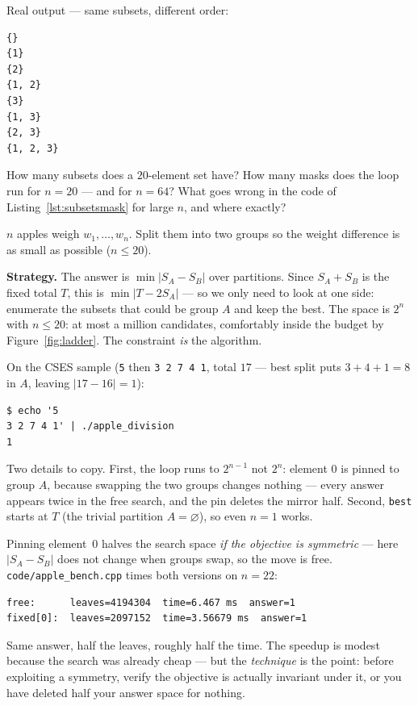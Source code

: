 Real output --- same subsets, different order:

\begin{lstlisting}[numbers=none]
{}
{1}
{2}
{1, 2}
{3}
{1, 3}
{2, 3}
{1, 2, 3}
\end{lstlisting}

\begin{exercise}[easy]\label{exr:subsetcount}
How many subsets does a $20$-element set have? How many masks does the loop
run for $n = 20$ --- and for $n = 64$? What goes wrong in the code of
Listing~\ref{lst:subsetsmask} for large $n$, and where exactly?
\end{exercise}

\begin{example}\label{ex:apple}
$n$ apples weigh $w_1, \dots, w_n$. Split them into two groups so the weight
difference is as small as possible ($n \le 20$).
\par\smallskip
\textbf{Strategy.} The answer is $\min |S_A - S_B|$ over partitions. Since
$S_A + S_B$ is the fixed total $T$, this is $\min |T - 2S_A|$ --- so we only
need to look at one side: enumerate the subsets that could be group $A$ and
keep the best. The space is $2^n$ with $n \le 20$: at most a million
candidates, comfortably inside the budget by Figure~\ref{fig:ladder}. The
constraint \emph{is} the algorithm.
\par\smallskip
\begin{solution}

On the CSES sample (\texttt{5} then \texttt{3 2 7 4 1}, total $17$ --- best
split puts $3+4+1=8$ in $A$, leaving $|17-16|=1$):
\begin{lstlisting}[numbers=none]
$ echo '5
3 2 7 4 1' | ./apple_division
1
\end{lstlisting}
Two details to copy. First, the loop runs to $2^{n-1}$ not $2^n$: element 0 is
pinned to group $A$, because swapping the two groups changes nothing --- every
answer appears twice in the free search, and the pin deletes the mirror half.
Second, \texttt{best} starts at $T$ (the trivial partition $A = \varnothing$),
so even $n = 1$ works.
\end{solution}
\end{example}

\begin{remark}
Pinning element~0 halves the search space \emph{if the objective is symmetric}
--- here $|S_A - S_B|$ does not change when groups swap, so the move is free.
\texttt{code/apple\_bench.cpp} times both versions on $n = 22$:
\begin{lstlisting}[numbers=none]
free:      leaves=4194304  time=6.467 ms  answer=1
fixed[0]:  leaves=2097152  time=3.56679 ms  answer=1
\end{lstlisting}
Same answer, half the leaves, roughly half the time. The speedup is modest
because the search was already cheap --- but the \emph{technique} is the
point: before exploiting a symmetry, verify the objective is actually
invariant under it, or you have deleted half your answer space for nothing.
\end{remark}


